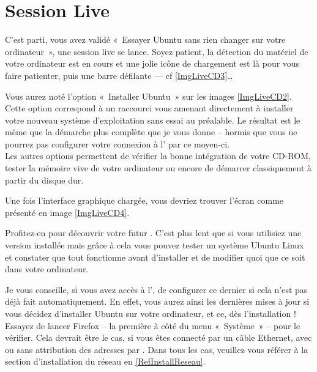 \section{Session Live}
\label{RefSessionLive}
C'est parti, vous avez validé «~Essayer Ubuntu sans rien changer sur votre ordinateur~», une session live se lance. Soyez patient, la détection du matériel de votre ordinateur est en cours et une jolie icône de chargement est là pour vous faire patienter, puis une barre défilante --- cf \ref{ImgLiveCD3}\ldots{}\par
\begin{nota}
Vous aurez noté l'option «~Installer Ubuntu~» sur les images \ref{ImgLiveCD2}. Cette option correspond à un raccourci vous amenant directement à installer votre nouveau système d'exploitation sans essai au préalable. Le résultat est le même que la démarche plus complète que je vous donne -- hormis que vous ne pourrez pas configurer votre connexion à l' par ce moyen-ci.\\
Les autres options permettent de vérifier la bonne intégration de votre CD-ROM, tester la mémoire vive de votre ordinateur ou encore de démarrer classiquement à partir du disque dur.
\end{nota}
Une fois l'interface graphique chargée, vous devriez trouver l'écran comme présenté en image \ref{ImgLiveCD4}.\par
{}
Profitez-en pour découvrir votre futur . C'est plus lent que si vous utilisiez une version installée mais grâce à cela vous pouvez tester un système Ubuntu Linux et constater que tout fonctionne avant d'installer et de modifier quoi que ce soit dans votre ordinateur.
\begin{nota}
Je vous conseille, si vous avez accès à l', de configurer ce dernier si cela n'est pas déjà fait automatiquement. En effet, vous aurez ainsi les dernières mises à jour si vous décidez d'installer Ubuntu sur votre ordinateur, et ce, dès l'installation ! Essayez de lancer Firefox -- la première  à côté du menu «~Système~» -- pour le vérifier. Cela devrait être le cas, si vous êtes connecté par un câble Ethernet,  avec ou sans attribution des adresses par . Dans tous les cas, veuillez vous référer à la section d'installation du réseau en \ref{RefInstallReseau}.
\end{nota}

